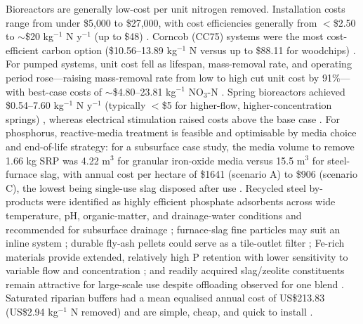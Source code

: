 Bioreactors are generally low-cost per unit nitrogen removed. Installation costs range from under \$5{,}000 to \$27{,}000, with cost efficiencies generally from $<$\$2.50 to $\sim$\$20 kg$^{-1}$ N y$^{-1}$ (up to \$48) \parencite{Christianson2021}. Corncob (CC75) systems were the most cost-efficient carbon option (\$10.56--13.89 kg$^{-1}$ N versus up to \$88.11 for woodchips) \parencite{Law2023}. For pumped systems, unit cost fell as lifespan, mass-removal rate, and operating period rose---raising mass-removal rate from low to high cut unit cost by 91\%---with best-case costs of $\sim$\$4.80--23.81 kg$^{-1}$ NO$_3$-N \parencite{Hartfiel2024}. Spring bioreactors achieved \$0.54--7.60 kg$^{-1}$ N y$^{-1}$ (typically $<$\$5 for higher-flow, higher-concentration springs) \parencite{Easton2019}, whereas electrical stimulation raised costs above the base case \parencite{Law2018}. For phosphorus, reactive-media treatment is feasible and optimisable by media choice and end-of-life strategy: for a subsurface case study, the media volume to remove 1.66 kg SRP was 4.22 m$^3$ for granular iron-oxide media versus 15.5 m$^3$ for steel-furnace slag, with annual cost per hectare of \$1641 (scenario A) to \$906 (scenario C), the lowest being single-use slag disposed after use \parencite{Hauda2020}. Recycled steel by-products were identified as highly efficient phosphate adsorbents across wide temperature, pH, organic-matter, and drainage-water conditions and recommended for subsurface drainage \parencite{Sellner2019b}; furnace-slag fine particles may suit an inline system \parencite{Sanford2016}; durable fly-ash pellets could serve as a tile-outlet filter \parencite{Li2017}; Fe-rich materials provide extended, relatively high P retention with lower sensitivity to variable flow and concentration \parencite{Pugliese2023}; and readily acquired slag/zeolite constituents remain attractive for large-scale use despite offloading observed for one blend \parencite{Agrawal2011b}. Saturated riparian buffers had a mean equalised annual cost of US\$213.83 (US\$2.94 kg$^{-1}$ N removed) and are simple, cheap, and quick to install \parencite{Jaynes2019}.

